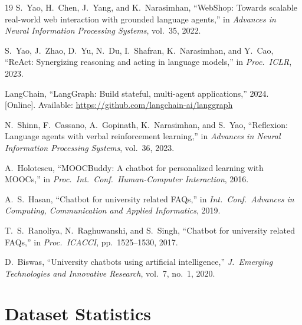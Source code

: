 \documentclass[conference,compsoc]{IEEEtran}
\begin{document}
\begin{thebibliography}{19}
S.~Yao, H.~Chen, J.~Yang, and K.~Narasimhan, ``WebShop: Towards scalable real-world web interaction with grounded language agents,'' in \emph{Advances in Neural Information Processing Systems}, vol.~35, 2022.

S.~Yao, J.~Zhao, D.~Yu, N.~Du, I.~Shafran, K.~Narasimhan, and Y.~Cao, ``ReAct: Synergizing reasoning and acting in language models,'' in \emph{Proc.\ ICLR}, 2023.

LangChain, ``LangGraph: Build stateful, multi-agent applications,'' 2024. [Online]. Available: \url{https://github.com/langchain-ai/langgraph}

N.~Shinn, F.~Cassano, A.~Gopinath, K.~Narasimhan, and S.~Yao, ``Reflexion: Language agents with verbal reinforcement learning,'' in \emph{Advances in Neural Information Processing Systems}, vol.~36, 2023.

A.~Holotescu, ``MOOCBuddy: A chatbot for personalized learning with MOOCs,'' in \emph{Proc.\ Int.\ Conf.\ Human-Computer Interaction}, 2016.

A.~S.~Hasan, ``Chatbot for university related FAQs,'' in \emph{Int.\ Conf.\ Advances in Computing, Communication and Applied Informatics}, 2019.

T.~S.~Ranoliya, N.~Raghuwanshi, and S.~Singh, ``Chatbot for university related FAQs,'' in \emph{Proc.\ ICACCI}, pp.~1525--1530, 2017.

D.~Biswas, ``University chatbots using artificial intelligence,'' \emph{J.\ Emerging Technologies and Innovative Research}, vol.~7, no.~1, 2020.

\end{thebibliography}

\appendices

\section{Dataset Statistics}
\end{document}
